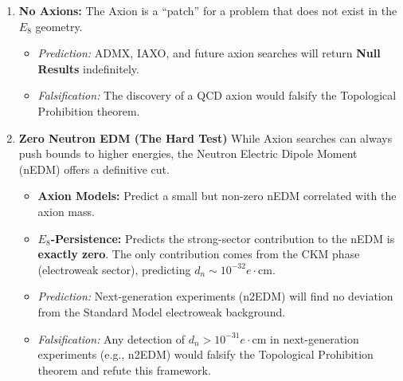 \begin{enumerate}
    \item \textbf{No Axions:} The Axion is a ``patch'' for a problem that does not exist in the $E_8$ geometry.
    \begin{itemize}
        \item \textit{Prediction:} ADMX, IAXO, and future axion searches will return \textbf{Null Results} indefinitely.
        \item \textit{Falsification:} The discovery of a QCD axion would falsify the Topological Prohibition theorem.
    \end{itemize}
    \item \textbf{Zero Neutron EDM (The Hard Test)}
        While Axion searches can always push bounds to higher energies, the Neutron Electric Dipole Moment (nEDM) offers a definitive cut.
        \begin{itemize}
            \item \textbf{Axion Models:} Predict a small but non-zero nEDM correlated with the axion mass.
            \item \textbf{$E_8$-Persistence:} Predicts the strong-sector contribution to the nEDM is \textbf{exactly zero}. The only contribution comes from the CKM phase (electroweak sector), predicting $d_n \sim 10^{-32} e \cdot \text{cm}$.
        \end{itemize}
    \begin{itemize}
        \item \textit{Prediction:} Next-generation experiments (n2EDM) will find no deviation from the Standard Model electroweak background.
        \item \textit{Falsification:} Any detection of $d_n > 10^{-31} e \cdot \text{cm}$ in next-generation experiments (e.g., n2EDM) would falsify the Topological Prohibition theorem and refute this framework.
    \end{itemize}
\end{enumerate}